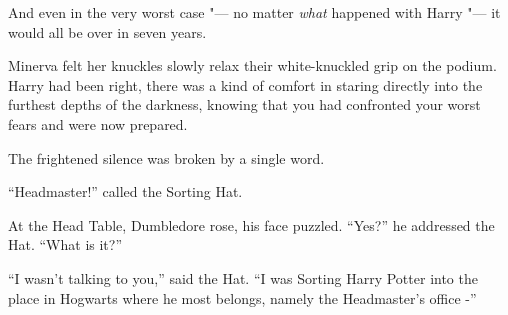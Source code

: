 And even in the very worst case "--- no matter \emph{what} happened with
Harry "--- it would all be over in seven years.

Minerva felt her knuckles slowly relax their white-knuckled grip on the
podium. Harry had been right, there was a kind of comfort in staring
directly into the furthest depths of the darkness, knowing that you had
confronted your worst fears and were now prepared.

The frightened silence was broken by a single word.

``Headmaster!'' called the Sorting Hat.

At the Head Table, Dumbledore rose, his face puzzled. ``Yes?'' he
addressed the Hat. ``What is it?''

``I wasn't talking to you,'' said the Hat. ``I was Sorting Harry Potter
into the place in Hogwarts where he most belongs, namely the
Headmaster's office -''
